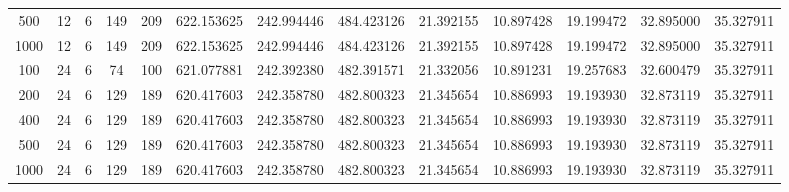 \begin{table}[h]
\begin{tabular}{ccccccccccccc}
500 & 12 & 6 & 149 & 209 & 622.153625 & 242.994446 & 484.423126 & 21.392155 & 10.897428 & 19.199472 & 32.895000 & 35.327911 \\
1000 & 12 & 6 & 149 & 209 & 622.153625 & 242.994446 & 484.423126 & 21.392155 & 10.897428 & 19.199472 & 32.895000 & 35.327911 \\
100 & 24 & 6 & 74 & 100 & 621.077881 & 242.392380 & 482.391571 & 21.332056 & 10.891231 & 19.257683 & 32.600479 & 35.327911 \\
200 & 24 & 6 & 129 & 189 & 620.417603 & 242.358780 & 482.800323 & 21.345654 & 10.886993 & 19.193930 & 32.873119 & 35.327911 \\
400 & 24 & 6 & 129 & 189 & 620.417603 & 242.358780 & 482.800323 & 21.345654 & 10.886993 & 19.193930 & 32.873119 & 35.327911 \\
500 & 24 & 6 & 129 & 189 & 620.417603 & 242.358780 & 482.800323 & 21.345654 & 10.886993 & 19.193930 & 32.873119 & 35.327911 \\
1000 & 24 & 6 & 129 & 189 & 620.417603 & 242.358780 & 482.800323 & 21.345654 & 10.886993 & 19.193930 & 32.873119 & 35.327911 \\
\bottomrule
\end{tabular}
\end{table}
